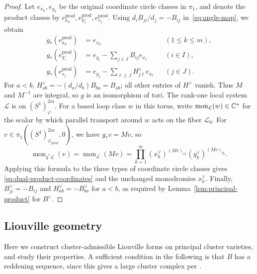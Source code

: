 \documentclass[12pt, letter]{amsart}
\theoremstyle{definition}
\numberwithin{equation}{section}
\begin{document}
\begin{proof}
Let $e_{x_k},e_{y_k}$ be the original coordinate circle classes in $\pi_1$,
and denote the product classes by
$e^{\mathrm{prod}}_{x_k},e^{\mathrm{prod}}_{Y_i},e^{\mathrm{prod}}_{s_j}$.
Using $d_iB_{ji}/d_j=-B_{ij}$ in~\eqref{eq:angle-map}, we obtain
\[
 \begin{aligned}
 g_*(e^{\mathrm{prod}}_{x_k})&=e_{x_k}&&(1\le k\le m),\\
 g_*(e^{\mathrm{prod}}_{Y_i})&=e_{y_i}-\sum_{j\in J}B_{ij}e_{x_j}
                                      &&(i\in I),\\
 g_*(e^{\mathrm{prod}}_{s_j})&=e_{y_j}-\sum_{\ell\in J}H^\vee_{j\ell}e_{x_\ell}
                                      &&(j\in J).
 \end{aligned}
\]
For $a<b$, $H^\vee_{ab}=-(d_a/d_b)B_{ba}=B_{ab}$;
all other entries of $H^\vee$ vanish.
Thus $M$ and $M^{-1}$ are integral, so $g$ is an isomorphism of tori.
The rank-one local system $\mathcal L$ is on
$(S^1)^{2m}_{\varphi}$. For a based loop class $w$ in this torus,
write $\operatorname{mon}_{\mathcal L}(w)\in\mathbb C^*$ for the scalar
by which parallel transport around $w$ acts on the fiber
$\mathcal L_0$.
For $v\in\pi_1((S^1)^{2m}_{\varphi_{\mathrm{prod}}},0)$,
we have $g_*v=Mv$, so
\[
 \operatorname{mon}_{g^*\mathcal L}(v)
 =\operatorname{mon}_{\mathcal L}(Mv)
 =\prod_{k=1}^m(x_k^\vee)^{(Mv)_{x_k}}
                     (y_k^\vee)^{(Mv)_{y_k}}.
\]
Applying this formula to the three types of coordinate circle classes gives
\eqref{eq:dual-product-coordinates} and the unchanged monodromies $x_k^\vee$.
Finally, $B^\vee_{ji}=-B_{ij}$ and
$H^\vee_{ab}=-B^\vee_{ba}$ for $a<b$, as required by
Lemma~\ref{lem:principal-product} for $B^\vee$.
\end{proof}

\subsection{Liouville geometry}


Here we construct cluster-admissible Liouville forms on principal cluster varieties, and study their properties.  A sufficient condition in the following is that $B$ has a reddening sequence, since this gives a large cluster complex
per \cite[Lemma~8.29]{GHKK}.
\end{document}
